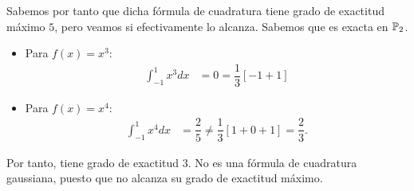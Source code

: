 \begin{ejercicio}
    Sabemos por tanto que dicha fórmula de cuadratura tiene grado de exactitud máximo $5$, pero veamos si efectivamente lo alcanza. Sabemos que es exacta en $\mathbb{P}_2$.
    \begin{itemize}
        \item Para $f(x) = x^3$:
        \begin{align*}
            \int_{-1}^{1} x^3 dx &= 0 = \dfrac{1}{3}\left[-1+1\right]
        \end{align*}
        \item Para $f(x) = x^4$:
        \begin{align*}
            \int_{-1}^{1} x^4 dx &= \dfrac{2}{5} \neq \dfrac{1}{3}\left[1+0+1\right] = \dfrac{2}{3}.
        \end{align*}
    \end{itemize}

    Por tanto, tiene grado de exactitud $3$. No es una fórmula de cuadratura gaussiana, puesto que no alcanza su grado de exactitud máximo.
\end{ejercicio}

